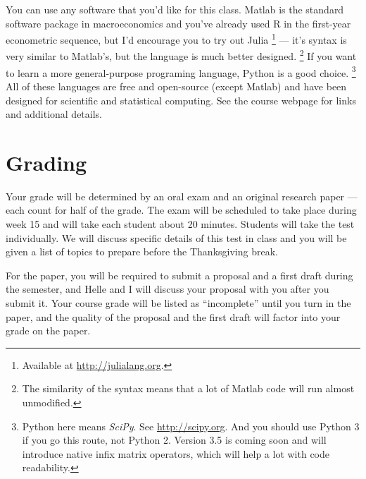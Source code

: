 \documentclass[nofonts]{tufte-handout}
\begin{document}
You can use any software that you'd like for this class.
Matlab is the standard software package in macroeconomics and you've
already used R in the first-year econometric sequence, but I'd
encourage you to try out Julia%
\footnote{Available at \url{http://julialang.org}.} %
--- it's syntax is very similar to
Matlab's, but the language is much better designed.%
\footnote{The similarity of the syntax means that a lot of Matlab code
  will run almost unmodified.} %
If you want to learn a more general-purpose programing language,
Python is a good choice.%
\footnote{Python here means \emph{SciPy}. See
  \url{http://scipy.org}. And you should use Python 3 if you go this
  route, not Python 2. Version 3.5 is coming soon and will introduce
  native infix matrix operators, which will help a lot with code
  readability.} %
All of these languages are free and open-source (except Matlab) and
have been designed for scientific and statistical computing. See the
course webpage for links and additional details.

\section{Grading}
Your grade will be determined by an oral exam and an original research
paper --- each count for half of the grade. The exam will be scheduled
to take place during week 15 and will take each student about 20
minutes. Students will take the test individually. We will discuss
specific details of this test in class and you will be given a list of
topics to prepare before the Thanksgiving break.

For the paper, you will be required to submit a proposal and a first
draft during the semester, and Helle and I will discuss your proposal
with you after you submit it. Your course grade will be listed as
``incomplete'' until you turn in the paper, and the quality of the
proposal and the first draft will factor into your grade on the paper.
\end{document}
